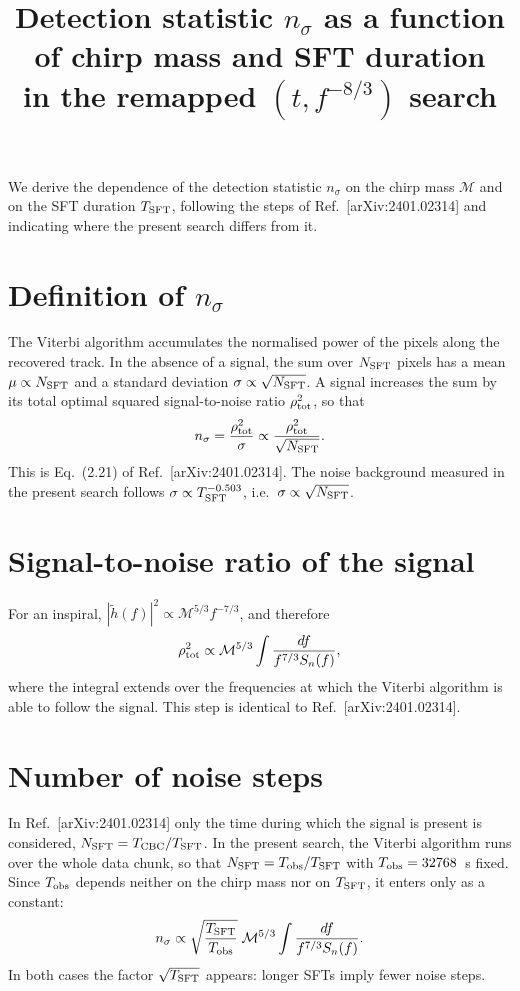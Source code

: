 \documentclass[11pt]{article}
\title{Detection statistic $n_\sigma$ as a function of chirp mass and SFT duration\\
in the remapped $(t, f^{-8/3})$ search}
\date{}
\newcommand{\Tsft}{T_{\rm SFT}}
\newcommand{\Mc}{\mathcal{M}}
\begin{document}
\maketitle

We derive the dependence of the detection statistic $n_\sigma$ on the chirp mass
$\Mc$ and on the SFT duration $\Tsft$, following the steps of
Ref.~[arXiv:2401.02314] and indicating where the present search differs from it.

\section{Definition of $n_\sigma$}

The Viterbi algorithm accumulates the normalised power of the pixels along the
recovered track. In the absence of a signal, the sum over $N_{\rm SFT}$ pixels has a
mean $\mu \propto N_{\rm SFT}$ and a standard deviation $\sigma \propto \sqrt{N_{\rm SFT}}$.
A signal increases the sum by its total optimal squared signal-to-noise ratio
$\rho^2_{\rm tot}$, so that
\begin{equation}
  n_\sigma = \frac{\rho^2_{\rm tot}}{\sigma} \propto \frac{\rho^2_{\rm tot}}{\sqrt{N_{\rm SFT}}} .
  \label{eq:nsigma}
\end{equation}
This is Eq.~(2.21) of Ref.~[arXiv:2401.02314]. The noise background measured in the
present search follows $\sigma \propto \Tsft^{-0.503}$, i.e.\ $\sigma \propto \sqrt{N_{\rm SFT}}$.

\section{Signal-to-noise ratio of the signal}

For an inspiral, $|\tilde h(f)|^2 \propto \Mc^{5/3} f^{-7/3}$, and therefore
\begin{equation}
  \rho^2_{\rm tot} \propto \Mc^{5/3} \int \frac{df}{f^{7/3} S_n(f)} ,
  \label{eq:rho}
\end{equation}
where the integral extends over the frequencies at which the Viterbi algorithm is
able to follow the signal. This step is identical to Ref.~[arXiv:2401.02314].

\section{Number of noise steps}

In Ref.~[arXiv:2401.02314] only the time during which the signal is present is
considered, $N_{\rm SFT} = T_{\rm CBC}/\Tsft$. In the present search, the Viterbi
algorithm runs over the whole data chunk, so that
$N_{\rm SFT} = T_{\rm obs}/\Tsft$ with $T_{\rm obs} = 32768$~s fixed. Since
$T_{\rm obs}$ depends neither on the chirp mass nor on $\Tsft$, it enters only as a
constant:
\begin{equation}
  n_\sigma \propto \sqrt{\frac{\Tsft}{T_{\rm obs}}}\; \Mc^{5/3} \int \frac{df}{f^{7/3} S_n(f)} .
  \label{eq:nsigma_tobs}
\end{equation}
In both cases the factor $\sqrt{\Tsft}$ appears: longer SFTs imply fewer noise steps.
\end{document}
